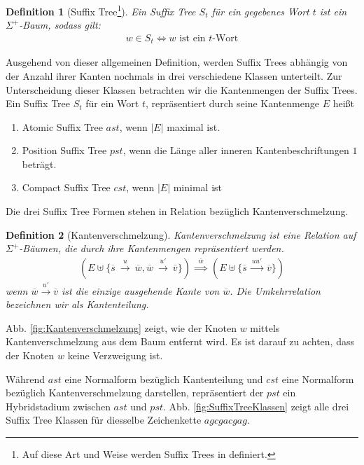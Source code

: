 \documentclass[12pt]{report}
\newtheorem{definition}{Definition}
\newcommand{\abs}[1]{\left|#1\right|}
\begin{document}
\begin{definition}[Suffix Tree\footnote{Auf diese Art und Weise werden Suffix Trees in \cite{Giegerich1995} definiert.}]
\label{def:SuffixTree}
Ein Suffix Tree $S_t$ für ein gegebenes Wort $t$ ist ein $\Sigma^+$-Baum, sodass gilt:
\begin{gather*}
    w \in S_t \Longleftrightarrow w \text{ ist ein }t\text{-Wort}
\end{gather*}
\end{definition}

Ausgehend von dieser allgemeinen Definition, werden Suffix Trees abhängig von der Anzahl ihrer Kanten nochmals in drei verschiedene Klassen unterteilt. Zur Unterscheidung dieser Klassen betrachten wir die Kantenmengen der Suffix Trees. Ein Suffix Tree $S_t$ für ein Wort $t$, repräsentiert durch seine Kantenmenge $E$ heißt
\begin{enumerate}
    \item Atomic Suffix Tree $ast$, wenn $\abs{E}$ maximal ist.
    \item Position Suffix Tree $pst$, wenn die Länge aller inneren Kantenbeschriftungen $1$ beträgt.
    \item Compact Suffix Tree $cst$, wenn $\abs{E}$ minimal ist
\end{enumerate}
Die drei Suffix Tree Formen stehen in Relation bezüglich Kantenverschmelzung.

\begin{definition}[Kantenverschmelzung]
Kantenverschmelzung ist eine Relation auf $\Sigma^+$-Bäumen, die durch ihre Kantenmengen repräsentiert werden.
\begin{gather*}
    \left(E \uplus \{\overline{s}\:\xrightarrow{u}\:\overline{w},\overline{w}\:\xrightarrow{u'}\:\overline{v}\}\right) \overset{\overline{w}}{\implies} \left(E \uplus \{\overline{s}\:\xrightarrow{uu'}\:\overline{v}\}\right)
\end{gather*}
wenn $\overline{w} \xrightarrow{u'} \overline{v}$ ist die einzige ausgehende Kante von $\overline{w}$. Die Umkehrrelation bezeichnen wir als Kantenteilung.
\end{definition}
Abb. \ref{fig:Kantenverschmelzung} zeigt, wie der Knoten $w$ mittels Kantenverschmelzung aus dem Baum entfernt wird. Es ist darauf zu achten, dass der Knoten $w$ keine Verzweigung ist.

Während $ast$ eine Normalform bezüglich Kantenteilung und $cst$ eine Normalform bezüglich Kantenverschmelzung darstellen, repräsentiert der $pst$ ein Hybridstadium zwischen $ast$ und $pst$. Abb. \ref{fig:SuffixTreeKlassen} zeigt alle drei Suffix Tree Klassen für diesselbe Zeichenkette $agcgacgag$.
\end{document}
